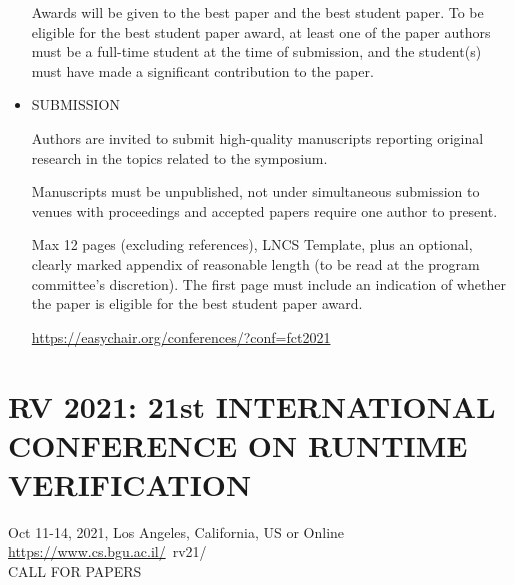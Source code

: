 \documentclass[prodmode,acmtecs]{acmsmall} %
\begin{document}
\begin{itemize}
  Awards will be given to the best paper and the best student paper. To be eligible for the best student paper award, at least one of the paper authors must be a full-time student at the time of submission, and the student(s) must have made a significant contribution to the paper. 
 
\item  SUBMISSION 
 
  Authors are invited to submit high-quality manuscripts reporting original  research in the topics related to the symposium.  
 
  Manuscripts must be unpublished, not under simultaneous submission to venues with proceedings and accepted papers require one author to present. 
 
  Max 12 pages (excluding references), LNCS Template, plus an optional, clearly marked appendix of reasonable length (to be read at the program committee's discretion). The first page must include an indication of whether the paper is eligible for the best student paper award. 
 
  \href{https://easychair.org/conferences/?conf=fct2021}{https://easychair.org/conferences/?conf=fct2021} 
 
\end{itemize}\section{RV 2021: 21st INTERNATIONAL CONFERENCE ON RUNTIME VERIFICATION}\label{RV2021}  Oct 11-14, 2021, Los Angeles, California, US or Online\\ 
  \href{https://www.cs.bgu.ac.il/}{https://www.cs.bgu.ac.il/}~rv21/\\ 
CALL FOR PAPERS 
\end{document}
